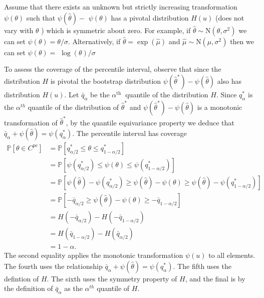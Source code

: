\documentclass[10pt]{article}
\begin{document}
Assume that there exists an unknown but strictly increasing transformation $\psi(\theta)$ such that $\psi(\widehat{\theta})-$ $\psi(\theta)$ has a pivotal distribution $H(u)$ (does not vary with $\theta$ ) which is symmetric about zero. For example, if $\widehat{\theta} \sim \mathrm{N}\left(\theta, \sigma^{2}\right)$ we can set $\psi(\theta)=\theta / \sigma$. Alternatively, if $\widehat{\theta}=\exp (\widehat{\mu})$ and $\widehat{\mu} \sim \mathrm{N}\left(\mu, \sigma^{2}\right)$ then we can set $\psi(\theta)=$ $\log (\theta) / \sigma$

To assess the coverage of the percentile interval, observe that since the distribution $H$ is pivotal the bootstrap distribution $\psi\left(\widehat{\theta}^{*}\right)-\psi(\widehat{\theta})$ also has distribution $H(u)$. Let $\bar{q}_{\alpha}$ be the $\alpha^{\text {th }}$ quantile of the distribution $H$. Since $q_{\alpha}^{*}$ is the $\alpha^{t h}$ quantile of the distribution of $\widehat{\theta}^{*}$ and $\psi\left(\widehat{\theta}^{*}\right)-\psi(\widehat{\theta})$ is a monotonic transformation of $\widehat{\theta}^{*}$, by the quantile equivariance property we deduce that $\bar{q}_{\alpha}+\psi(\widehat{\theta})=\psi\left(q_{\alpha}^{*}\right)$. The percentile interval has coverage
$$
\begin{aligned}
\mathbb{P}\left[\theta \in C^{\mathrm{pc}}\right] &=\mathbb{P}\left[q_{\alpha / 2}^{*} \leq \theta \leq q_{1-\alpha / 2}^{*}\right] \\
&=\mathbb{P}\left[\psi\left(q_{\alpha / 2}^{*}\right) \leq \psi(\theta) \leq \psi\left(q_{1-\alpha / 2}^{*}\right)\right] \\
&=\mathbb{P}\left[\psi(\widehat{\theta})-\psi\left(q_{\alpha / 2}^{*}\right) \geq \psi(\widehat{\theta})-\psi(\theta) \geq \psi(\widehat{\theta})-\psi\left(q_{1-\alpha / 2}^{*}\right)\right] \\
&=\mathbb{P}\left[-\bar{q}_{\alpha / 2} \geq \psi(\widehat{\theta})-\psi(\theta) \geq-\bar{q}_{1-\alpha / 2}\right] \\
&=H\left(-\bar{q}_{\alpha / 2}\right)-H\left(-\bar{q}_{1-\alpha / 2}\right) \\
&=H\left(\bar{q}_{1-\alpha / 2}\right)-H\left(\bar{q}_{\alpha / 2}\right) \\
&=1-\alpha .
\end{aligned}
$$
The second equality applies the monotonic transformation $\psi(u)$ to all elements. The fourth uses the relationship $\bar{q}_{\alpha}+\psi(\widehat{\theta})=\psi\left(q_{\alpha}^{*}\right)$. The fifth uses the defintion of $H$. The sixth uses the symmetry property of $H$, and the final is by the definition of $\bar{q}_{\alpha}$ as the $\alpha^{t h}$ quantile of $H$.
\end{document}
